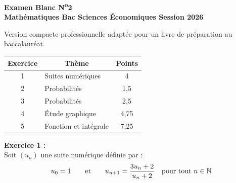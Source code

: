 
\cleardoublepage
{}
\thispagestyle{empty}

\begin{center}
  {\LARGE\bfseries\color{navy} Examen Blanc N\textsuperscript{o}2}\\[0.3cm]
  {\large\bfseries Math\'{e}matiques \textemdash{} Bac Sciences \'{E}conomiques \textemdash{} Session 2026}
\end{center}

\smallskip
{\small Version compacte professionnelle adapt\'{e}e pour un livre de pr\'{e}paration au baccalaur\'{e}at.}
\smallskip

\begin{center}
\renewcommand{\arraystretch}{1.3}
\begin{tabular}{|c|l|c|}
  \hline
  \rowcolor{navylight}
  \textbf{\color{navy}Exercice} & \multicolumn{1}{c|}{\textbf{\color{navy}Th\`{e}me}} & \textbf{\color{navy}Points} \\
  \hline
  1 & Suites num\'{e}riques & 4 \\
  \hline
  2 & Probabilit\'{e}s & 1,5 \\
  \hline
  3 & Probabilit\'{e}s & 2,5 \\
  \hline
  4 & \'{E}tude graphique & 4,75 \\
  \hline
  5 & Fonction et int\'{e}grale & 7,25 \\
  \hline
\end{tabular}
\end{center}

\bigskip

\noindent\textbf{Exercice 1 :}\\
Soit $(u_n)$ une suite num\'{e}rique d\'{e}finie par :
\[
  u_0 = 1 \qquad \text{et} \qquad
  u_{n+1} = \frac{3u_n + 2}{u_n + 2}
  \quad \text{pour tout } n \in \mathbb{N}
\]

